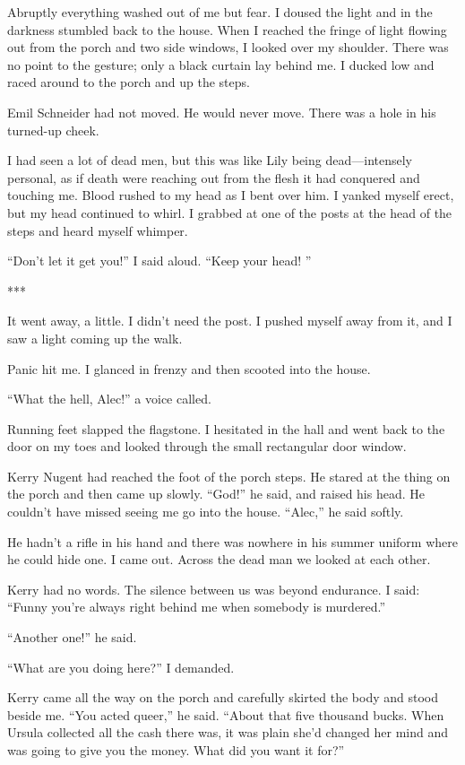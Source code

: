 {Abruptly everything washed out of me but fear. I doused the light and in the darkness stumbled back to the house. When I reached the fringe of light flowing out from the porch and two side windows, I looked over my shoulder. There was no point to the gesture; only a black curtain lay behind me. I ducked low and raced around to the porch and up the steps.

Emil Schneider had not moved. He would never move. There was a hole in his turned-up cheek.

I had seen a lot of dead men, but this was like Lily being dead—intensely personal, as if death were reaching out from the flesh it had conquered and touching me. Blood rushed to my head as I bent over him. I yanked myself erect, but my head continued to whirl. I grabbed at one of the posts at the head of the steps and heard myself whimper.

“Don’t let it get you!” I said aloud. “Keep your head! ”

***

It went away, a little. I didn’t need the post. I pushed myself away from it, and I saw a light coming up the walk.

Panic hit me. I glanced in frenzy and then scooted into the house.

“What the hell, Alec!” a voice called.

Running feet slapped the flagstone. I hesitated in the hall and went back to the door on my toes and looked through the small rectangular door window.

Kerry Nugent had reached the foot of the porch steps. He stared at the thing on the porch and then came up slowly. “God!” he said, and raised his head. He couldn’t have missed seeing me go into the house. “Alec,” he said softly.

He hadn’t a rifle in his hand and there was nowhere in his summer uniform where he could hide one. I came out. Across the dead man we looked at each other.

Kerry had no words. The silence between us was beyond endurance. I said: “Funny you’re always right behind me when somebody is murdered.”

“Another one!” he said.

“What are you doing here?” I demanded.

Kerry came all the way on the porch and carefully skirted the body and stood beside me. “You acted queer,” he said. “About that five thousand bucks. When Ursula collected all the cash there was, it was plain she’d changed her mind and was going to give you the money. What did you want it for?”

}
